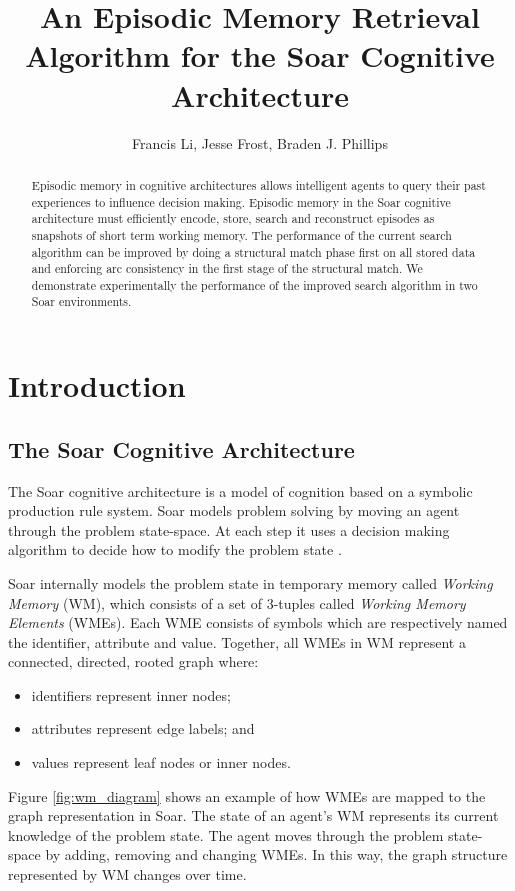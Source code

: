 \documentclass[envcountsame]{llncs}
\begin{document}
\title{An Episodic Memory Retrieval Algorithm for the Soar Cognitive Architecture}
\author{Francis Li, Jesse Frost, Braden J. Phillips}
\maketitle

\begin{abstract}

  Episodic memory in cognitive architectures allows intelligent agents to query their past experiences to influence decision making.
  Episodic memory in the Soar cognitive architecture must efficiently encode, store, search and reconstruct episodes as snapshots of short term working memory.
  The performance of the current search algorithm can be improved by doing a structural match phase first on all stored data and enforcing arc consistency in the first stage of the structural match.
  We demonstrate experimentally the performance of the improved search algorithm in two Soar environments.

\end{abstract}

\section{Introduction}

  \subsection{The Soar Cognitive Architecture}

  The Soar cognitive architecture is a model of cognition based on a symbolic production rule system.
  Soar models problem solving by moving an agent through the problem state-space.
  At each step it uses a decision making algorithm to decide how to modify the problem state \cite{laird12}. 
  
  Soar internally models the problem state in temporary memory called \emph{Working Memory} (WM), which consists of a set of 3-tuples called \emph{Working Memory Elements} (WMEs).
  Each WME consists of symbols which are respectively named the identifier, attribute and value.
  Together, all WMEs in WM represent a connected, directed, rooted graph where:
  \begin{itemize}
    \item identifiers represent inner nodes;
    \item attributes represent edge labels; and
    \item values represent leaf nodes or inner nodes.
  \end{itemize}
  Figure \ref{fig:wm_diagram} shows an example of how WMEs are mapped to the graph representation in Soar.
  The state of an agent's WM represents its current knowledge of the problem state.
  The agent moves through the problem state-space by adding, removing and changing WMEs.
  In this way, the graph structure represented by WM changes over time.
\end{document}
